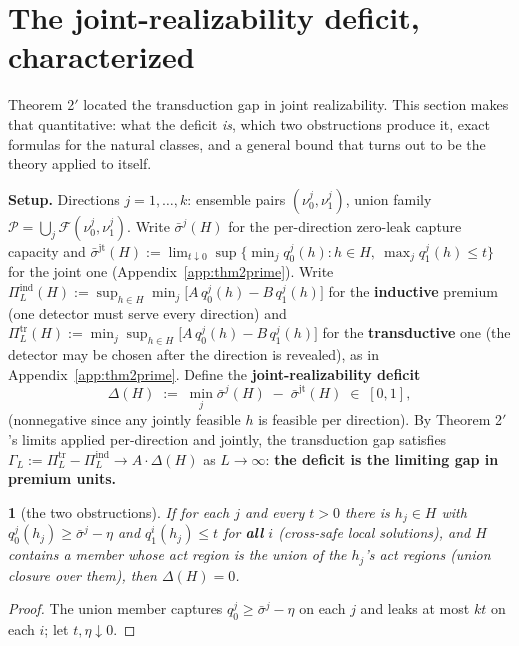 \documentclass[11pt]{article}
\theoremstyle{plain}
\newtheorem*{namedthminner}{\namedthmname}
\newenvironment{nthm}[1]{\def\namedthmname{#1}\begin{namedthminner}}{\end{namedthminner}}
\theoremstyle{definition}
\begin{document}
\section{The joint-realizability deficit, characterized}\label{app:deficit}

Theorem 2$'$ located the transduction gap in joint realizability. This section
makes that quantitative: what the deficit \emph{is}, which two obstructions
produce it, exact formulas for the natural classes, and a general bound that
turns out to be the theory applied to itself.

\textbf{Setup.} Directions $j = 1, \dots, k$: ensemble pairs $(\nu_0^j, \nu_1^j)$,
union family $\mathcal{P} = \bigcup_j \mathcal{F}(\nu_0^j, \nu_1^j)$. Write
$\bar\sigma^j(H)$ for the per-direction zero-leak capture capacity and
$\bar\sigma^{\mathrm{jt}}(H) := \lim_{t \downarrow 0} \sup\{\min_j q_0^j(h) :
h \in H,\ \max_j q_1^j(h) \leq t\}$ for the joint one (Appendix~\ref{app:thm2prime}). Write
$\Pi^{\mathrm{ind}}_L(H) := \sup_{h \in H} \min_j \big[A\,q_0^j(h) - B\,q_1^j(h)\big]$
for the \textbf{inductive} premium (one detector must serve every direction) and
$\Pi^{\mathrm{tr}}_L(H) := \min_j \sup_{h \in H} \big[A\,q_0^j(h) - B\,q_1^j(h)\big]$
for the \textbf{transductive} one (the detector may be chosen after the
direction is revealed), as in Appendix~\ref{app:thm2prime}. Define the
\textbf{joint-realizability deficit}
$$\Delta(H) \;:=\; \min_j \bar\sigma^j(H) \;-\; \bar\sigma^{\mathrm{jt}}(H) \;\in\; [0, 1],$$
(nonnegative since any jointly feasible $h$ is feasible per direction). By
Theorem 2$'$'s limits applied per-direction and jointly, the transduction gap
satisfies $\Gamma_L := \Pi^{\mathrm{tr}}_L - \Pi^{\mathrm{ind}}_L \to
A \cdot \Delta(H)$ as $L \to \infty$: \textbf{the deficit is the limiting gap in
premium units.}

\begin{nthm}{Proposition 4}[the two obstructions]
If for each $j$ and every $t > 0$
there is $h_j \in H$ with $q_0^j(h_j) \geq \bar\sigma^j - \eta$ and
$q_1^i(h_j) \leq t$ for \textbf{all} $i$ (\emph{cross-safe} local solutions), and $H$
contains a member whose act region \emph{is} the union of the $h_j$'s act
regions (\emph{union closure} over them), then $\Delta(H) = 0$.
\end{nthm}

\begin{proof}
The union member captures $q_0^j \geq \bar\sigma^j - \eta$ on each
$j$ and leaks at most $kt$ on each $i$; let $t, \eta \downarrow 0$.
\end{proof}
\end{document}
